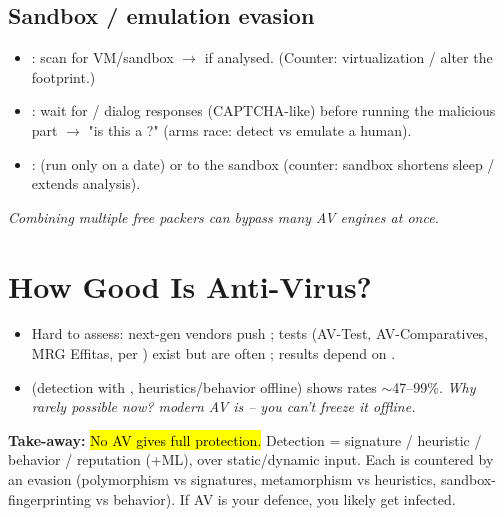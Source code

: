 \subsection{Sandbox / emulation evasion}
\begin{itemize}
\item {}: scan for VM/sandbox  $\to$  if analysed. (Counter:  virtualization / alter the footprint.)
\item {}: wait for  / dialog responses (CAPTCHA-like) before running the malicious part $\to$ "is this a ?" (arms race: detect vs emulate a human).
\item {}:  (run only on a date) or  to  the sandbox (counter: sandbox shortens sleep / extends analysis).
\end{itemize}
\textit{Combining multiple free packers can bypass many AV engines at once.}

\section{How Good Is Anti-Virus?}
\begin{itemize}
\item Hard to assess: next-gen vendors push ;  tests (AV-Test, AV-Comparatives, MRG Effitas, per ) exist but are often ; results depend on .
\item {} (detection with , heuristics/behavior offline) shows  rates $\sim$47--99\%. \textit{Why rarely possible now? modern AV is  -- you can't freeze it offline.}
\end{itemize}

\begin{defbox}
\textbf{Take-away:} \hl{No AV gives full protection.} Detection = signature / heuristic / behavior / reputation (+ML), over static/dynamic input. Each is countered by an evasion (polymorphism vs signatures, metamorphism vs heuristics, sandbox-fingerprinting vs behavior). If AV is your  defence, you  likely get infected.
\end{defbox}

